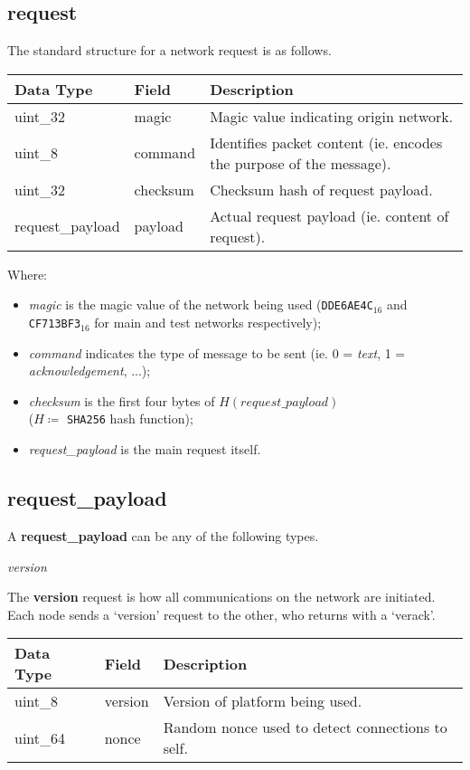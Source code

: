 \documentclass{article}
\begin{document}
\subsection{request}
The standard structure for a network request is as follows.
\begin{table}[H]
\centering
\begin{tabular}{|p{2.5cm}|p{2cm}|p{5.5cm}|}
\hline
\rowcolor{tblgrey} 
Data Type   & Field       & Description                                      \\ \hline
uint\_32    & magic       & Magic value indicating origin network.           \\ \hline
uint\_8     & command     & Identifies packet content (ie. encodes the purpose of the message). \\ \hline
uint\_32    & checksum    & Checksum hash of request payload.                \\ \hline
request\_payload & payload     & Actual request payload (ie. content of request). \\ \hline
\end{tabular}
\end{table}
Where:
\begin{itemize}
    \item \textit{magic} is the magic value of the network being used (\texttt{DDE6AE4C}$_{16}$ and \texttt{CF713BF3}$_{16}$ for main and test networks respectively);
    \item \textit{command} indicates the type of message to be sent (ie. 0 = \textit{text}, 1 = \textit{acknowledgement}, ...);
    \item \textit{checksum} is the first four bytes of $H(request\_payload)$ \\
    ($H \coloneqq$ \texttt{SHA256} hash function);
    \item \textit{request\_payload} is the main request itself.
\end{itemize}

\newpage

\subsection{request\_payload}
A \textbf{request\_payload} can be any of the following types.

\begin{center}
    \large \textit{version}
\end{center}
The \textbf{version} request is how all communications on the network are initiated. Each node sends a `version' request to the other, who returns with a `verack'.
\begin{table}[H]
\centering
\begin{tabular}{|p{1.5cm}|p{2.5cm}|p{5.5cm}|}
\hline
\rowcolor{tblgrey}
Data Type   & Field       & Description\\ \hline
uint\_8     & version     & Version of platform being used.                          \\ \hline
uint\_64    & nonce       & Random nonce used to detect connections to self.                   \\ \hline
\end{tabular}
\end{table}
\end{document}
